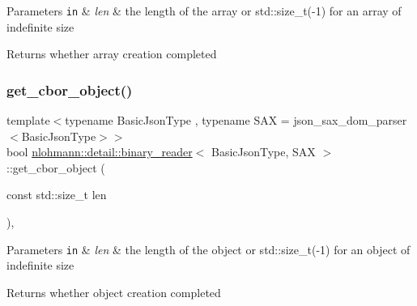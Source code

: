 \begin{DoxyParams}[1]{Parameters}
\mbox{\tt in}  & {\em len} & the length of the array or std\+::size\+\_\+t(-\/1) for an array of indefinite size \\
\hline
\end{DoxyParams}
\begin{DoxyReturn}{Returns}
whether array creation completed 
\end{DoxyReturn}
\mbox{\label{classnlohmann_1_1detail_1_1binary__reader_a2fcc776cd2c7bb52bbc511e97d36978a}} 
\subsubsection{\texorpdfstring{get\+\_\+cbor\+\_\+object()}{get\_cbor\_object()}}
{\footnotesize\ttfamily template$<$typename Basic\+Json\+Type , typename S\+AX  = json\+\_\+sax\+\_\+dom\+\_\+parser$<$\+Basic\+Json\+Type$>$$>$ \\
bool \mbox{\hyperlink{classnlohmann_1_1detail_1_1binary__reader}{nlohmann\+::detail\+::binary\+\_\+reader}}$<$ Basic\+Json\+Type, S\+AX $>$\+::get\+\_\+cbor\+\_\+object (\begin{DoxyParamCaption}\item[{const std\+::size\+\_\+t}]{len }\end{DoxyParamCaption})\hspace{0.3cm}{\ttfamily [inline]}, {\ttfamily [private]}}


\begin{DoxyParams}[1]{Parameters}
\mbox{\tt in}  & {\em len} & the length of the object or std\+::size\+\_\+t(-\/1) for an object of indefinite size \\
\hline
\end{DoxyParams}
\begin{DoxyReturn}{Returns}
whether object creation completed 
\end{DoxyReturn}
\mbox{\label{classnlohmann_1_1detail_1_1binary__reader_acca76844160000e1d8215cb5c7afbba1}} 
